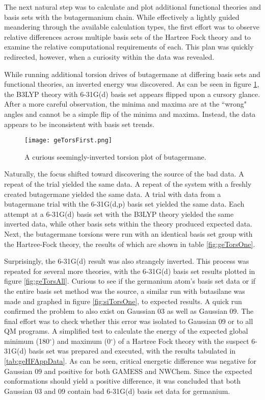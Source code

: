 The next natural step was to calculate and plot additional functional theories and basis sets with the butagermanium chain. 
While effectively a lightly guided meandering through the available calculation types, the first effort was to observe relative differences across multiple basis sets of the Hartree Fock theory and to examine the relative computational requirements of each.
This plan was quickly redirected, however, when a curiosity within the data was revealed.

While running additional torsion drives of butagermane at differing basis sets and functional theories, an inverted energy was discovered. 
As can be seen in figure \ref{fig:geTorsFirst}, the B3LYP theory with 6-31G(d) basis set appears flipped upon a cursory glance. 
After a more careful observation, the minima and maxima are at the ``wrong" angles and cannot be a simple flip of the minima and maxima.
Instead, the data appears to be inconsistent with basis set trends.

\begin{figure}
	
	\centering
	
	\texttt{[image: geTorsFirst.png]}
	
	\caption{A curious seemingly-inverted torsion plot of butagermane.}
	
	\label{fig:geTorsFirst}
	
\end{figure}

Naturally, the focus shifted toward discovering the source of the bad data.
A repeat of the trial yielded the same data.
A repeat of the system with a freshly created butagermane yielded the same data.
A trial with data from a butagermane trial with the 6-31G(d,p) basis set yielded the same data.
Each attempt at a 6-31G(d) basis set with the B3LYP theory yielded the same inverted data, while other basis sets within the theory produced expected data. 
Next, the butagermane torsions were run with an identical basis set group with the Hartree-Fock theory, the results of which are shown in table \ref{fig:geTorsOne}.

Surprisingly, the 6-31G(d) result was also strangely inverted.
This process was repeated for several more theories, with the 6-31G(d) basis set results plotted in figure \ref{fig:geTorsAll}.
Curious to see if the germanium atom's basis set data or if the entire basis set method was the source, a similar run with butasilane was made and graphed in figure \ref{fig:siTorsOne}, to expected results.
A quick run confirmed the problem to also exist on Gaussian 03 as well as Gaussian 09.
The final effort was to check whether this error was isolated to Gaussian 09 or to all QM programs. 
A simplified test to calculate the energy of the expected global minimum (180$^{\circ}$) and maximum (0$^{\circ}$) of a Hartree Fock theory with the suspect 6-31G(d) basis set was prepared and executed, with the results tabulated in \ref{tab:geHFAppData}.
As can be seen, critical energetic difference was negative for Gaussian 09 and positive for both GAMESS and NWChem.
Since the expected conformations should yield a positive difference, it was concluded that both Gaussian 03 and 09 contain bad 6-31G(d) basis set data for germanium.

